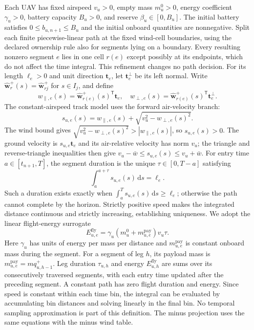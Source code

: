 Each UAV has fixed airspeed $v_u>0$, empty mass $m_u^0>0$, energy
coefficient $\gamma_u>0$, battery capacity $B_u>0$, and reserve
$\beta_u\in[0,B_u]$. The initial battery satisfies
$0\le b_{u,n+1}\le B_u$ and the initial onboard quantities are nonnegative.
Split each finite piecewise-linear path at the fixed wind-cell boundaries,
using the declared ownership rule also for segments lying on a boundary.
Every resulting nonzero segment $e$ lies in one cell $r(e)$ except possibly
at its endpoints, which do not affect the time integral. This refinement
changes no path decision. For its length $\ell_e>0$ and unit direction
$\mathbf t_e$, let $\mathbf t_e^\perp$ be its left normal. Write
$\widehat{\mathbf w}_{r}^{+}(s)=\widehat{\mathbf w}_{rj}^{+}$ for $s\in I_j$,
and define
\begin{equation}
w_{\parallel,e}(s)=\widehat{\mathbf w}_{r(e)}^{+}(s)^{\mathsf T}\mathbf t_e,
\quad
w_{\perp,e}(s)=\widehat{\mathbf w}_{r(e)}^{+}(s)^{\mathsf T}\mathbf t_e^\perp.
\label{eq:wind_components}
\end{equation}
The constant-airspeed track model uses the forward air-velocity branch:
\begin{equation}
s_{u,e}(s)=w_{\parallel,e}(s)
+\sqrt{v_u^2-w_{\perp,e}(s)^2}.
\label{eq:ground_speed}
\end{equation}
The wind bound gives
$\sqrt{v_u^2-w_{\perp,e}(s)^2}>|w_{\parallel,e}(s)|$,
so $s_{u,e}(s)>0$. The ground velocity is $s_{u,e}\mathbf t_e$ and its
air-relative velocity has norm $v_u$; the triangle and reverse-triangle
inequalities then give
$v_u-\bar w\le s_{u,e}(s)\le v_u+\bar w$.
For entry time
$a\in[t_{n+1},T]$, the segment duration is the unique
$\tau\in[0,T-a]$ satisfying
\begin{equation}
\int_a^{a+\tau}s_{u,e}(s)\,\mathrm ds=\ell_e.
\label{eq:travel_relation}
\end{equation}
Such a duration exists exactly when
$\int_a^T s_{u,e}(s)\,\mathrm ds\ge\ell_e$; otherwise the path cannot
complete by the horizon. Strictly positive speed makes the integrated
distance continuous and strictly increasing, establishing uniqueness.
We adopt the linear flight-energy surrogate
\begin{equation}
E_{u,e}^{\mathrm{fly}}
=\gamma_u(m_u^0+m_{u,e}^{\mathrm{pay}})v_u\tau.
\label{eq:flight_energy}
\end{equation}
Here $\gamma_u$ has units of energy per mass per distance and
$m_{u,e}^{\mathrm{pay}}$ is constant onboard mass during the segment.
For a segment of leg $h$, its payload mass is
$m_{u,e}^{\mathrm{pay}}=mq_{u,h-1}^{+}$.
Leg duration $\tau_{u,h}$ and energy $E_{u,h}^{\mathrm{fly}}$ are sums
over its consecutively traversed segments, with each entry time updated
after the preceding segment. A constant path has zero flight duration and
energy. Since speed is constant within each time bin, the integral can be
evaluated by accumulating bin distances and solving linearly in the final
bin. No temporal sampling approximation is part of this definition.
The minus projection uses the same equations with the minus wind table.

